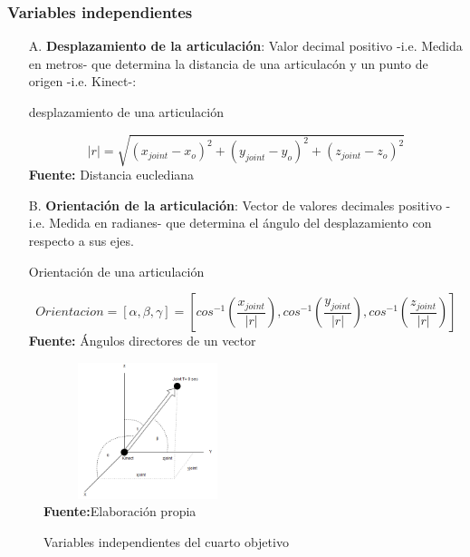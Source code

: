 \subsubsection{Variables independientes} \label{vr:4o:indep}
\begin{enumerate}
	\item[A.] \textbf{Desplazamiento de la articulaci\'on}: Valor decimal positivo -i.e. Medida en metros- que determina la distancia de una articulac\'on y un punto de origen -i.e. Kinect-:
\begin{formula}[h]
	\centering
	\caption{desplazamiento de una articulaci\'on}
	\label{frm:desplazaUser}
	\begin{equation}
|r|=\sqrt{(x_{joint}-x_{o})^{2}+(y_{joint}-y_{o})^{2}+(z_{joint}-z_{o})^{2}}
	\end{equation}
	\textbf{Fuente:} Distancia euclediana \cite[p.~423]{ayres2001calculo}
\end{formula}  
	\item[B.] \textbf{Orientaci\'on de la articulaci\'on}: Vector de valores decimales positivo -i.e. Medida en radianes- que determina el \'angulo del desplazamiento con respecto a sus ejes.
\begin{formula}[h]
	\centering
	\caption{Orientaci\'on de una articulaci\'on}
	\label{frm:orientUser}
	\begin{equation}
Orientacion = [\alpha ,\beta ,\gamma ] = [cos^{-1}(\frac{x_{joint}}{|r|}),cos^{-1}(\frac{y_{joint}}{|r|}),cos^{-1}(\frac{z_{joint}}{|r|})]
	\end{equation}
	\textbf{Fuente:} \'Angulos directores de un vector \cite[p.~424]{ayres2001calculo}
\end{formula}  
\end{enumerate}
\medbreak
\begin{figure}[H]
	\caption{Variables independientes del cuarto objetivo}
	\label{fig:varIdep4}
	\centering
	\includegraphics[width=230px,height=150px]{graphics/var-4obj-ind.png} \\
	\textbf{Fuente:}Elaboraci\'on propia 
\end{figure}
